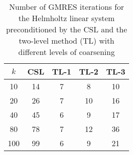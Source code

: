 \begin{table}[t]
\centering
\begin{tabular}{ccccc}
\hline
$k$ & CSL & TL-1 & TL-2 & TL-3 \\ \hline
10 & 14 & 7 & 8 & 10 \\
20 & 26 & 7 & 10 & 16 \\
40 & 45 & 6 & 9 & 17 \\
80 & 78 & 7 & 12 & 36 \\
100 & 99 & 6 & 9 & 21 \\
\hline
\end{tabular}
\caption{Number of GMRES iterations for the Helmholtz linear system preconditioned by the  CSL and the two-level method (TL) with different levels of coarsening}
\label{table:gmres_csl_vs_adef_coarse_eps_10}
\end{table}
